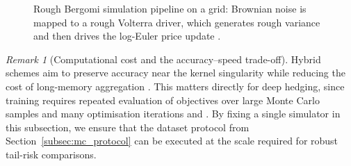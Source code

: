 \documentclass[12pt,a4paper]{article}
\theoremstyle{definition}
\theoremstyle{plain}
\theoremstyle{remark}
\newtheorem{remark}{Remark}[section]
\theoremstyle{plain}
\begin{document}
\begin{figure}[H]
\centering
{}
\caption{Rough Bergomi simulation pipeline on a grid: Brownian noise is mapped to a rough Volterra driver, which generates rough variance and then drives the log-Euler price update \cite{BayerFriz2016}.}
\label{fig:rb_pipeline}
\end{figure}
\FloatBarrier

\begin{remark}[Computational cost and the accuracy--speed trade-off]
\label{rem:rb_cost_tradeoff}
Hybrid schemes aim to preserve accuracy near the kernel singularity while reducing the cost of long-memory aggregation \cite{BayerFriz2016}.
This matters directly for deep hedging, since training requires repeated evaluation of objectives over large Monte Carlo samples and many optimisation iterations \cite{Buehler2019DeepHedging} and \cite{Horvath2021DeepRough}.
By fixing a single simulator in this subsection, we ensure that the dataset protocol from Section~\ref{subsec:mc_protocol} can be executed at the scale required for robust tail-risk comparisons.
\end{remark}
\end{document}
